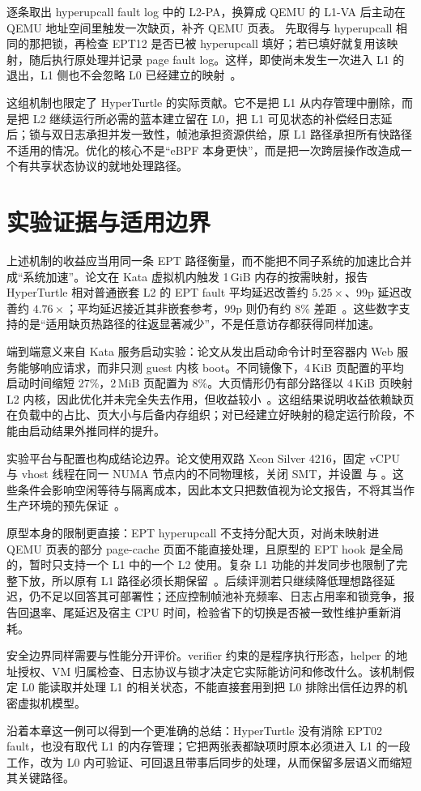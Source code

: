  逐条取出 hyperupcall fault log 中的 L2-PA，换算成 QEMU 的 L1-VA 后主动在 QEMU 地址空间里触发一次缺页，补齐 QEMU 页表。 先取得与 hyperupcall 相同的那把锁，再检查 EPT12 是否已被 hyperupcall 填好；若已填好就复用该映射，随后执行原处理并记录 page fault log。这样，即使尚未发生一次进入 L1 的退出，L1 侧也不会忽略 L0 已经建立的映射~\cite{source8}。

这组机制也限定了 HyperTurtle 的实际贡献。它不是把 L1 从内存管理中删除，而是把 L2 继续运行所必需的蓝本建立留在 L0，把 L1 可见状态的补偿经日志延后；锁与双日志承担并发一致性，帧池承担资源供给，原 L1 路径承担所有快路径不适用的情况。优化的核心不是“eBPF 本身更快”，而是把一次跨层操作改造成一个有共享状态协议的就地处理路径。

\section{实验证据与适用边界}\label{sec:ht-eval}

上述机制的收益应当用同一条 EPT 路径衡量，而不能把不同子系统的加速比合并成“系统加速”。论文在 Kata 虚拟机内触发 1\,GiB 内存的按需映射，报告 HyperTurtle 相对普通嵌套 L2 的 EPT fault 平均延迟改善约 $5.25\times$、99p 延迟改善约 $4.76\times$；平均延迟接近其非嵌套参考，99p 则仍有约 8\% 差距~\cite[\S5.1]{source8}。这些数字支持的是“适用缺页热路径的往返显著减少”，不是任意访存都获得同样加速。

端到端意义来自 Kata 服务启动实验：论文从发出启动命令计时至容器内 Web 服务能够响应请求，而非只测 guest 内核 boot。不同镜像下，4\,KiB 页配置的平均启动时间缩短 27\%，2\,MiB 页配置为 8\%。大页情形仍有部分路径以 4\,KiB 页映射 L2 内核，因此优化并未完全失去作用，但收益较小~\cite[\S5.2]{source8}。这组结果说明收益依赖缺页在负载中的占比、页大小与后备内存组织；对已经建立好映射的稳定运行阶段，不能由启动结果外推同样的提升。

实验平台与配置也构成结论边界。论文使用双路 Xeon Silver 4216，固定 vCPU 与 vhost 线程在同一 NUMA 节点内的不同物理核，关闭 SMT，并设置  与 。这些条件会影响空闲等待与隔离成本，因此本文只把数值视为论文报告，不将其当作生产环境的预先保证~\cite[\S5, Table 6]{source8}。

原型本身的限制更直接：EPT hyperupcall 不支持分配大页，对尚未映射进 QEMU 页表的部分 page-cache 页面不能直接处理，且原型的 EPT hook 是全局的，暂时只支持一个 L1 中的一个 L2 使用。复杂 L1 功能的并发同步也限制了完整下放，所以原有 L1 路径必须长期保留~\cite[\S4.8]{source8}。后续评测若只继续降低理想路径延迟，仍不足以回答其可部署性；还应控制帧池补充频率、日志占用率和锁竞争，报告回退率、尾延迟及宿主 CPU 时间，检验省下的切换是否被一致性维护重新消耗。

安全边界同样需要与性能分开评价。verifier 约束的是程序执行形态，helper 的地址授权、VM 归属检查、日志协议与锁才决定它实际能访问和修改什么。该机制假定 L0 能读取并处理 L1 的相关状态，不能直接套用到把 L0 排除出信任边界的机密虚拟机模型。

沿着本章这一例可以得到一个更准确的总结：HyperTurtle 没有消除 EPT02 fault，也没有取代 L1 的内存管理；它把两张表都缺项时原本必须进入 L1 的一段工作，改为 L0 内可验证、可回退且带事后同步的处理，从而保留多层语义而缩短其关键路径。

